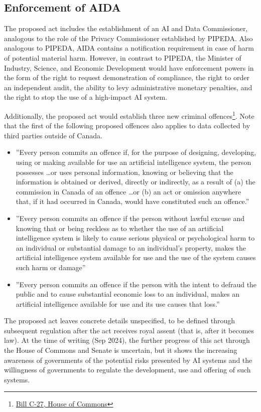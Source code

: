 \subsection*{Enforcement of AIDA}

The proposed act includes the establishment of an AI and Data Commissioner, analogous to the role of the Privacy Commissioner established by PIPEDA. Also analogous to PIPEDA, AIDA contains a notification requirement in case of harm of potential material harm. However, in contrast to PIPEDA, the Minister of Industry, Science, and Economic Development would have enforcement powers in the form of the right to request demonstration of compliance, the right to order an independent audit, the ability to levy administrative monetary penalties, and the right to stop the use of a high-impact AI system. 

Additionally, the proposed act would establish three new criminal offences\footnote{\href{https://www.parl.ca/DocumentViewer/en/44-1/bill/C-27/first-reading}{Bill C-27, House of Commons}}. Note that the first of the following proposed offences also applies to data collected by third parties outside of Canada.
\begin{itemize}
  \item ''Every person commits an offence if, for the purpose of designing, developing, using or making available for use an artificial intelligence system, the person possesses \ldots or uses personal information, knowing or believing that the information is obtained or derived, directly or indirectly, as a result of (a) the commission in Canada of an offence \ldots or (b) an act or omission anywhere that, if it had occurred in Canada, would have constituted such an offence.''
  \item ''Every person commits an offence if the person without lawful excuse and knowing that or being reckless as to whether the use of an artificial intelligence system is likely to cause serious physical or psychological harm to an individual or substantial damage to an individual's property, makes the artificial intelligence system available for use and the use of the system causes such harm or damage''
  \item ''Every person commits an offence if the person with the intent to defraud the public and to cause substantial economic loss to an individual, makes an artificial intelligence available for use and its use causes that loss.''
\end{itemize}

The proposed act leaves concrete details unspecified, to be defined through subsequent regulation after the act receives royal assent (that is, after it becomes law). At the time of writing (Sep 2024), the further progress of this act through the House of Commons and Senate is uncertain, but it shows the increasing awareness of governments of the potential risks presented by AI systems and the willingness of governments to regulate the development, use and offering of such systems. 

